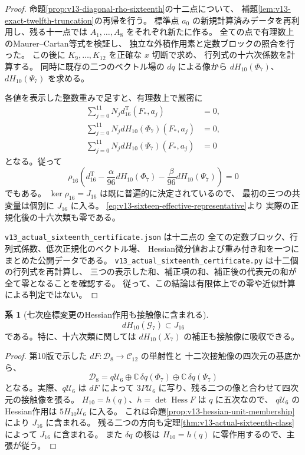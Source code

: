 \documentclass[a4paper,11pt]{ltjsarticle}
\theoremstyle{definition}
\newtheorem{corollary}[theorem]{系}
\begin{document}
\begin{proof}
命題\ref{prop:v13-diagonal-rho-sixteenth}の十二点について、
補題\ref{lem:v13-exact-twelfth-truncation}の再帰を行う。
標準点 $a_0$ の新規計算済みデータを再利用し、残る十一点では
$A_1,\ldots,A_8$ をそれぞれ新たに作る。
全ての点で有理数上のMaurer--Cartan等式を検証し、
独立な外積作用素と定数ブロックの照合を行った。
この後に $K_9,\ldots,K_{12}$ を正確な $x$ 切断で求め、
行列式の十六次係数を計算する。
同時に既存の二つのベクトル場の $dq$ による像から
$dH_{10}(\Phi_7)$、$dH_{10}(\Psi_7)$ を求める。

各値を表示した整数重みで足すと、有理数上で厳密に
\begin{align*}
 \sum_{j=0}^{11}N_jd^{\mathrm T}_{16}(F_*,a_j)&=0,\\
 \sum_{j=0}^{11}N_jdH_{10}(\Phi_7)(F_*,a_j)&=0,\\
 \sum_{j=0}^{11}N_jdH_{10}(\Psi_7)(F_*,a_j)&=0
\end{align*}
となる。従って
\[
 \rho_{16}\left(
 d^{\mathrm T}_{16}-\frac{\alpha}{96}dH_{10}(\Phi_7)
                   -\frac{\beta}{96}dH_{10}(\Psi_7)\right)=0
\]
でもある。
$\ker\rho_{16}=J_{16}$ は既に普遍的に決定されているので、
最初の三つの共変量は個別に $J_{16}$ に入る。
\eqref{eq:v13-sixteen-effective-representative}より
実際の正規化後の十六次類も零である。

\texttt{v13\_actual\_sixteenth\_certificate.json} は十二点の
全ての定数ブロック、行列式係数、低次正規化のベクトル場、
Hessian微分値および重み付き和を一つにまとめた公開データである。
\texttt{v13\_actual\_sixteenth\_certificate.py} は十二個の行列式を再計算し、
三つの表示した和、補正項の和、補正後の代表元の和が全て零となることを確認する。
従って、この結論は有限体上での零や近似計算による判定ではない。
\end{proof}

\begin{corollary}[七次座標変更のHessian作用も接触像に含まれる]
\label{cor:v13-seventh-Hessian-in-image}
\[
 dH_{10}(\mathcal G_7)\subset J_{16}
\]
である。特に、十六次類に関しては
$dH_{10}(X_7)$ の補正も接触像に吸収できる。
\end{corollary}
\begin{proof}
第10版で示した $dF:\mathcal D_8\to\mathcal C_{12}$ の単射性と
十二次接触像の四次元の基底から、
\[
 \mathcal D_8
 =q\mathcal U_6\oplus
       \mathbb C\,\delta q(\Phi_7)\oplus
       \mathbb C\,\delta q(\Psi_7)
\]
となる。実際、$q\mathcal U_6$ は $dF$ によって
$3P\mathcal U_6$ に写り、残る二つの像と合わせて四次元の接触像を張る。
$H_{10}=h(q)$、$h=\det\operatorname{Hess}F$ は $q$ に五次なので、
$q\mathcal U_6$ のHessian作用は $5H_{10}\mathcal U_6$ に入る。
これは命題\ref{prop:v13-hessian-unit-membership}により $J_{16}$ に含まれる。
残る二つの方向も定理\ref{thm:v13-actual-sixteenth-class}によって
$J_{16}$ に含まれる。
また $\delta q$ の核は $H_{10}=h(q)$ に零作用するので、主張が従う。
\end{proof}
\end{document}
